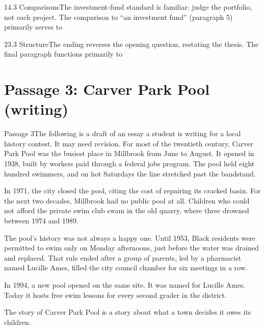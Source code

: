 \documentclass[11pt]{article}
\begin{document}
\begin{q}{1}{4.3 Comparisons}{The investment-fund standard is familiar: judge the portfolio, not each project.}
The comparison to ``an investment fund'' (paragraph 5) primarily serves to
\end{q}

\begin{q}{2}{3.3 Structure}{The ending reverses the opening question, restating the thesis.}
The final paragraph functions primarily to
\end{q}

\section{Passage 3: Carver Park Pool (writing)}

\begin{passage}{Passage 3}{The following is a draft of an essay a student is writing for a local history contest. It may need revision.}
  For most of the twentieth century, Carver Park Pool was the busiest place in Millbrook from June to August.  It opened in 1938, built by workers paid through a federal jobs program.  The pool held eight hundred swimmers, and on hot Saturdays the line stretched past the bandstand.

  In 1971, the city closed the pool, citing the cost of repairing its cracked basin.  For the next two decades, Millbrook had no public pool at all.  Children who could not afford the private swim club swam in the old quarry, where three drowned between 1974 and 1989.

  The pool's history was not always a happy one.  Until 1953, Black residents were permitted to swim only on Monday afternoons, just before the water was drained and replaced.  That rule ended after a group of parents, led by a pharmacist named Lucille Ames, filled the city council chamber for six meetings in a row.

  In 1994, a new pool opened on the same site.  It was named for Lucille Ames.  Today it hosts free swim lessons for every second grader in the district.

  The story of Carver Park Pool is a story about what a town decides it owes its children.
\end{passage}
\end{document}
